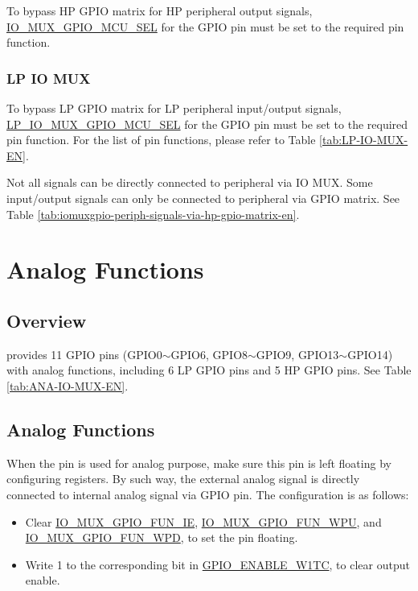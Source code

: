 \documentclass[main\_\_EN.tex]{subfiles}
\begin{document}
To bypass HP GPIO matrix for HP peripheral output signals, \hyperref[fielddesc:IOMUXGPIONMCUSEL]{IO\_MUX\_GPIO\_MCU\_SEL} for the GPIO pin must be set to the required pin function.

\subsubsection{LP IO MUX}

To bypass LP GPIO matrix for LP peripheral input/output signals, \hyperref[fielddesc:LPIOMUXGPIONMCUSEL] {LP\_IO\_MUX\_GPIO\_MCU\_SEL} for the GPIO pin must be set to the required pin function. For the list of pin functions, please refer to Table \ref{tab:LP-IO-MUX-EN}.

\begin{tiplisting}
Not all signals can be directly connected to peripheral via IO MUX. Some input/output signals can only be connected to peripheral via GPIO matrix. See Table \ref{tab:iomuxgpio-periph-signals-via-hp-gpio-matrix-en}.
\end{tiplisting}

\section{Analog Functions}

\subsection{Overview}
\chipname{} provides 11 GPIO pins (GPIO0$\sim$GPIO6, GPIO8$\sim$GPIO9, GPIO13$\sim$GPIO14) with analog functions, including 6 LP GPIO pins and 5 HP GPIO pins. See Table \ref{tab:ANA-IO-MUX-EN}.

\subsection{Analog Functions}
When the pin is used for analog purpose, make sure this pin is left floating by configuring registers. By such way, the external analog signal is directly connected to internal analog signal via GPIO pin. The configuration is as follows:

\begin{itemize}
    \item Clear  \hyperref[fielddesc:IOMUXGPIONFUNIE]{IO\_MUX\_GPIO\_FUN\_IE}, \hyperref[fielddesc:IOMUXGPIONFUNWPU]{IO\_MUX\_GPIO\_FUN\_WPU}, and \hyperref[fielddesc:IOMUXGPIONFUNWPD]{IO\_MUX\_GPIO\_FUN\_WPD}, to set the pin floating.
    \item Write 1 to the corresponding bit in  \hyperref[regdesc:GPIOENABLEW1TCREG]{GPIO\_ENABLE\_W1TC}, to clear output enable.
\end{itemize}
\end{document}
